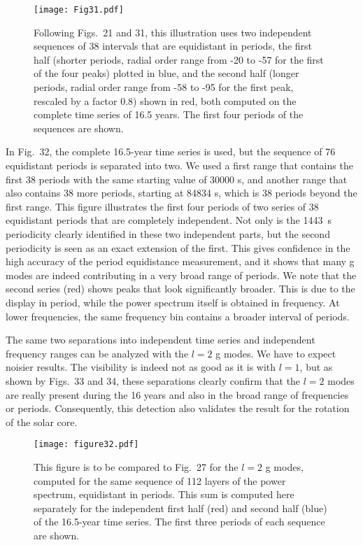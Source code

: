 \documentclass[bibyear]{aa}
\begin{document}
\begin{figure}
\centering
\texttt{[image: Fig31.pdf]}
\caption{Following Figs.~21 and 31, this illustration uses two independent sequences of 38 intervals that are equidistant in periods, the first half (shorter periods, radial order range from -20 to -57 for the first of the four peaks) plotted in blue, and the second half (longer periods, radial order range from -58 to -95 for the first peak, rescaled by a factor 0.8) shown
in red, both computed on the complete time series of 16.5 years. The first four periods of the sequences are shown. }
\label{fig:max_row_C1_20-57_58-95}
\end{figure} 


In Fig.~32, the complete 16.5-year time series is used, but the sequence of 76 equidistant periods is separated into two. We used a first range that contains the first 38 periods with the same starting value of 30000 s, and another range that also contains 38 more periods, starting at 84834 s, which is 38 periods beyond the first range. This figure illustrates the first four periods of two series of 38 equidistant periods that are completely independent. Not only is the 1443~s periodicity clearly identified in these two independent parts, but the second periodicity is seen as an exact extension of the first. This gives confidence in the high accuracy of the period equidistance measurement, and it shows that  many g modes are indeed contributing in a very broad range of periods. We note that the second series (red) shows peaks that look significantly broader. This is due to the display in period, while the power spectrum itself is obtained in frequency. At lower frequencies, the same frequency bin contains a broader interval of periods.

The same two separations into independent time series and independent frequency ranges can be analyzed with the $l=2$ g modes. We have to expect noisier  results. The visibility is  indeed not as good as it is with $l=1$,  but as shown by Figs.~33 and 34, these separations clearly confirm that the $l=2$ modes are really present during the 16 years and also in the broad range of frequencies or periods. Consequently, this detection also validates the result
for the rotation of the solar core. 

\begin{figure}
\centering
\texttt{[image: figure32.pdf]}
\caption{This figure is to be compared to Fig.~27 for the $l=2$ g modes, computed for the same sequence of 112 layers of the power spectrum, equidistant in periods.  This sum is computed here separately for the independent first half (red) and second half (blue) of the 16.5-year time series. The first three periods of each sequence are shown.}
\label{fig:C2_cut_8y_8y}
\end{figure} 
\end{document}
